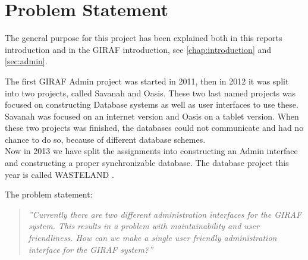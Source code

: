 \chapter{Problem Statement}
The general purpose for this project has been explained both in this reports introduction and in the GIRAF introduction, see \ref{chap:introduction} and \ref{sec:admin}.

The first GIRAF Admin project was started in 2011, then in 2012 it was split into two projects, called Savanah and Oasis. These two last named projects was focused on constructing Database systems as well as user interfaces to use these. Savanah was focused on an internet version and Oasis on a tablet version. When these two projects was finished, the databases could not communicate and had no chance to do so, because of different database schemes.\\
Now in 2013 we have split the assignments into constructing an Admin interface and constructing a proper synchronizable database. The database project this year is called WASTELAND \citep{wasteland}.


The problem statement:
\begin{verse}
\textit{''Currently there are two different administration interfaces for the GIRAF system.
This results in a problem with maintainability and user friendliness.
How can we make a single user friendly administration interface for the GIRAF system?''}
\end{verse}